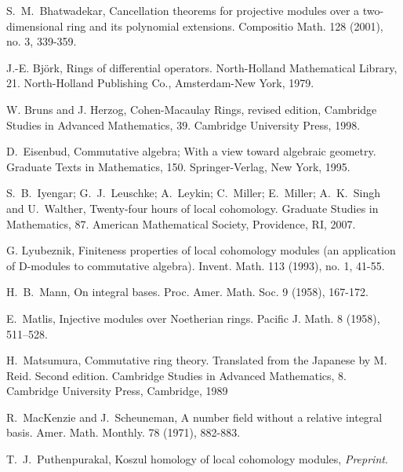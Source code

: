 \documentclass{amsart}
\theoremstyle{plain}
\theoremstyle{definition}
\theoremstyle{remark}
\numberwithin{equation}{theorem}
\begin{document}
\begin{thebibliography}{10}

 S.~M.~Bhatwadekar,
Cancellation theorems for projective modules over a two-dimensional ring and its polynomial extensions.
Compositio Math. 128 (2001), no. 3, 339-359.

 J.-E. Bj{\"{o}}rk,
Rings of differential operators.
North-Holland Mathematical Library, 21. North-Holland Publishing Co., Amsterdam-New York, 1979.

  W. Bruns and J. Herzog,
Cohen-Macaulay Rings, revised edition,
Cambridge Studies in Advanced Mathematics, 39.
Cambridge University Press, 1998.

 D.~Eisenbud,
Commutative algebra; With a view toward algebraic geometry.
 Graduate Texts in Mathematics, 150. Springer-Verlag, New York, 1995.

 S.~B.~Iyengar; G.~J.~Leuschke; A.~Leykin; C.~Miller; E.~Miller; A.~K.~Singh and U.~Walther,
Twenty-four hours of local cohomology.
Graduate Studies in Mathematics, 87. American Mathematical Society, Providence, RI, 2007.

 G. Lyubeznik,
Finiteness properties of local cohomology modules (an application of D-modules to commutative algebra).
Invent. Math. 113 (1993), no. 1, 41-55.

 H.~B.~Mann,
 On integral bases.
 Proc. Amer. Math. Soc. 9 (1958), 167-172.

 E.~Matlis,
Injective modules over Noetherian rings.
Pacific J. Math. 8 (1958), 511--528.

 H.~Matsumura,
 Commutative ring theory. Translated from the Japanese by M. Reid. Second edition.
 Cambridge Studies in Advanced Mathematics, 8. Cambridge University Press, Cambridge, 1989

 R.~MacKenzie and J.~Scheuneman,
A number field without a relative integral basis.
Amer. Math. Monthly. 78 (1971), 882-883.

 T.~J.~Puthenpurakal,
Koszul homology of local cohomology modules,
\textit{Preprint}.

\end{thebibliography}
\end{document}
